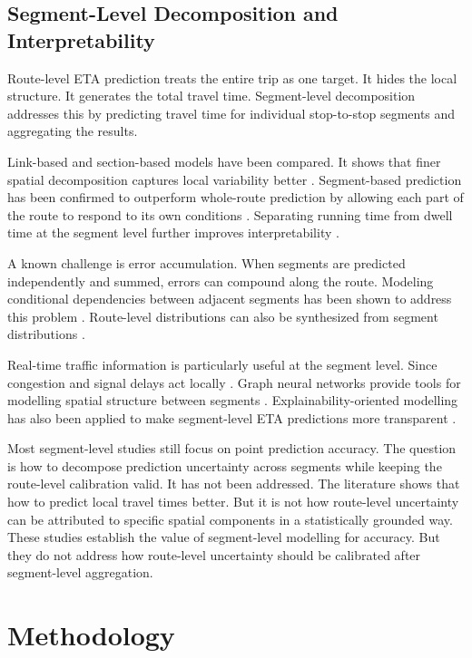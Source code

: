 \documentclass[12pt, a4paper, oneside]{report}
\begin{document}
\section{Segment-Level Decomposition and Interpretability}

Route-level ETA prediction treats the entire trip as one target. It hides the local structure. It generates the total travel time. Segment-level decomposition addresses this by predicting travel time for individual stop-to-stop segments and aggregating the results.

Link-based and section-based models have been compared. It shows that finer spatial decomposition captures local variability better \cite{Chen201160}. Segment-based prediction has been confirmed to outperform whole-route prediction by allowing each part of the route to respond to its own conditions \cite{Dunne2023141}. Separating running time from dwell time at the segment level further improves interpretability \cite{Baptista20121620}.

A known challenge is error accumulation. When segments are predicted independently and summed, errors can compound along the route. Modeling conditional dependencies between adjacent segments has been shown to address this problem \cite{Buchel2022}. Route-level distributions can also be synthesized from segment distributions \cite{Isukapati201371, Eisele2015286}.

Real-time traffic information is particularly useful at the segment level. Since congestion and signal delays act locally \cite{Ma2019536, Julio2016250}. Graph neural networks provide tools for modelling spatial structure between segments \cite{Ma2022, Zhang202115008}. Explainability-oriented modelling has also been applied to make segment-level ETA predictions more transparent \cite{Warnakulasuriya20242131}.

Most segment-level studies still focus on point prediction accuracy. The question is how to decompose prediction uncertainty across segments while keeping the route-level calibration valid. It has not been addressed. The literature shows that how to predict local travel times better. But it is not how route-level uncertainty can be attributed to specific spatial components in a statistically grounded way. These studies establish the value of segment-level modelling for accuracy. But they do not address how route-level uncertainty should be calibrated after segment-level aggregation.

\chapter{Methodology}
\label{ch:methodology}
\end{document}
